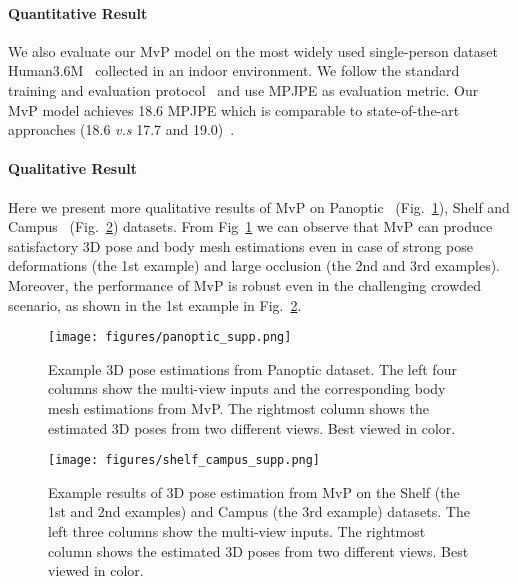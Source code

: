 \documentclass{article}
\begin{document}
\paragraph{Quantitative Result}
We also evaluate our MvP model on the most widely used single-person dataset Human3.6M~\cite{ionescu2014human3} collected in an indoor environment. We follow the standard training and evaluation protocol~\cite{martinez2017simple,iskakov2019learnable,Tu2020} and use MPJPE as evaluation metric. Our MvP model achieves 18.6 MPJPE which is comparable to state-of-the-art approaches (18.6 \textit{v.s} 17.7 and 19.0)~\cite{iskakov2019learnable,Tu2020}.

\paragraph{Qualitative Result}
Here we present more qualitative results of MvP on Panoptic~\cite{joo2017panoptic} (Fig.~\ref{supp:panoptic}), Shelf and Campus~\cite{belagiannis20143d} (Fig.~\ref{supp:shelf_and_campus}) datasets. From Fig~\ref{supp:panoptic} we can observe that MvP can produce satisfactory 3D pose and body mesh estimations even in case of strong pose deformations (the 1st example) and large occlusion (the 2nd and 3rd examples). Moreover, the performance of MvP is robust even in the challenging crowded scenario, as shown in the 1st example in Fig.~\ref{supp:shelf_and_campus}. 


\begin{figure}[t]
	\centering
	\texttt{[image: figures/panoptic\_supp.png]}
	\caption{
    Example 3D pose estimations from Panoptic dataset. The left four columns show the multi-view inputs and the corresponding body mesh estimations from MvP. The rightmost column shows the estimated 3D poses from two different views.
    Best viewed in color. 
	}
	\label{supp:panoptic}
\end{figure}

\begin{figure}[h!]
	\centering
	\texttt{[image: figures/shelf\_campus\_supp.png]}
	\caption{
    Example results of 3D pose estimation from MvP on the  Shelf (the 1st and 2nd examples) and Campus (the 3rd example) datasets. The left three columns show the multi-view inputs. The rightmost column shows the estimated 3D poses from two different views.
    Best viewed in color. 
	}
	\label{supp:shelf_and_campus}
\end{figure}
\end{document}
